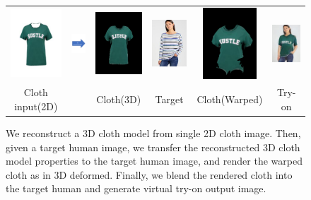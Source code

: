 \begin{figure}[t]
\begin{tabular}{cccccc}
\includegraphics[width=2cm]{figures/c2dw/000005_1.png}&
\includegraphics[width=2cm]{figures/arrow_recon.png}&
\includegraphics[width=2cm]{figures/c3drecon/000005_1_000303_0.png}&
\includegraphics[width=2cm]{figures/image/000303_0.jpg}&
\includegraphics[width=2cm]{figures/c3dwfull/000005_1_000303_0.png}&
\includegraphics[width=2cm]{figures/try-on/000005_1_000303_0.jpg}\\

  Cloth input(2D)&&Cloth(3D)&Target&Cloth(Warped)&Try-on\\

\end{tabular}

    \caption{We reconstruct a 3D cloth model from single 2D cloth image. Then, given a target human image, we transfer the reconstructed 3D cloth model properties to the target human image, and render the warped cloth as in 3D deformed. Finally, we blend the rendered cloth into the target human and generate virtual try-on output image.}
    \label{fig:summary}
\end{figure}



